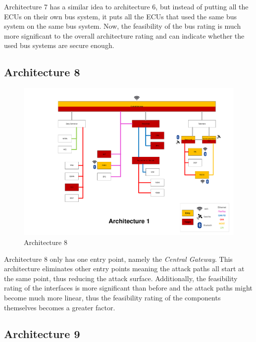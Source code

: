 Architecture 7 has a similar idea to architecture 6, but instead of putting all the ECUs on their own bus system, it puts all the ECUs that used the same bus system on the same bus system.
Now, the feasibility of the bus rating is much more significant to the overall architecture rating and can indicate whether the used bus systems are secure enough.\par



\subsection*{Architecture 8}
\label{sec:arch8}

\begin{figure}[h!]
    \caption{Architecture 8}
    \includegraphics[width=\textwidth, page=8]{../Architectures-survey.pdf}
\end{figure}

Architecture 8 only has one entry point, namely the \textit{Central Gateway}. 
This architecture eliminates other entry points meaning the attack paths all start at the same point, thus reducing the attack surface.
Additionally, the feasibility rating of the interfaces is more significant than before and the attack paths might become much more linear, thus the feasibility rating of the components themselves becomes a greater factor.\par


\subsection*{Architecture 9}
\label{sec:arch9}

